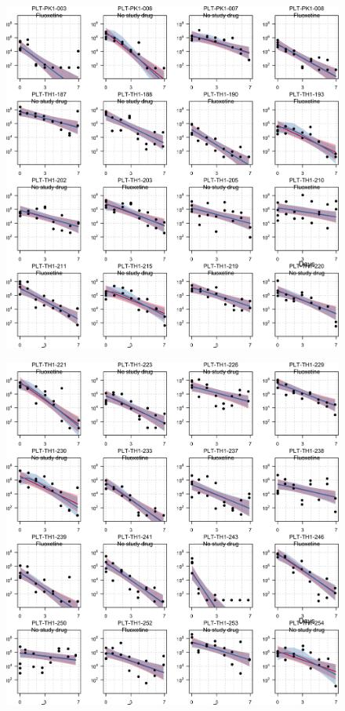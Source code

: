 \documentclass[
  letterpaper,
  DIV=11,
  numbers=noendperiod]{scrartcl}
\begin{document}
\begin{figure}[H]

{\centering \includegraphics{Fluoxetine_analysis_files/figure-pdf/individ_data-3.png}

}

\end{figure}

\begin{figure}[H]

{\centering \includegraphics{Fluoxetine_analysis_files/figure-pdf/individ_data-4.png}

}

\end{figure}
\end{document}
